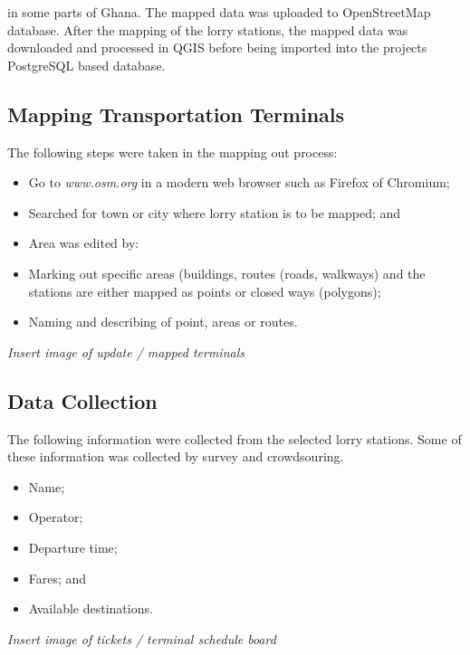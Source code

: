 in some parts of Ghana. The mapped data was uploaded to OpenStreetMap database. After the mapping of the lorry stations, the mapped data was downloaded and processed in QGIS before being imported into the projects PostgreSQL based database.

\subsection{Mapping Transportation Terminals}
The following steps were taken in the mapping out process:
\begin{itemize}
	\item Go to \textit{www.osm.org} in a modern web browser such as Firefox of Chromium; 
	\item Searched for town or city where lorry station is to be mapped; and 
	\item Area was edited by: 
	\item Marking out specific areas (buildings, routes (roads, walkways) and the stations are either mapped as points or closed ways (polygons);  
	\item Naming  and describing of point, areas or routes. 
\end{itemize}

\textit{Insert image of update / mapped terminals}

\subsection{Data Collection}
The following information were collected from the selected lorry stations. Some of these information was collected by survey and crowdsouring.
\begin{itemize}
	\item Name;
	\item Operator;
	\item Departure time;
	\item Fares; and 
	\item Available destinations.
\end{itemize}

\textit{Insert image of tickets / terminal schedule board}


